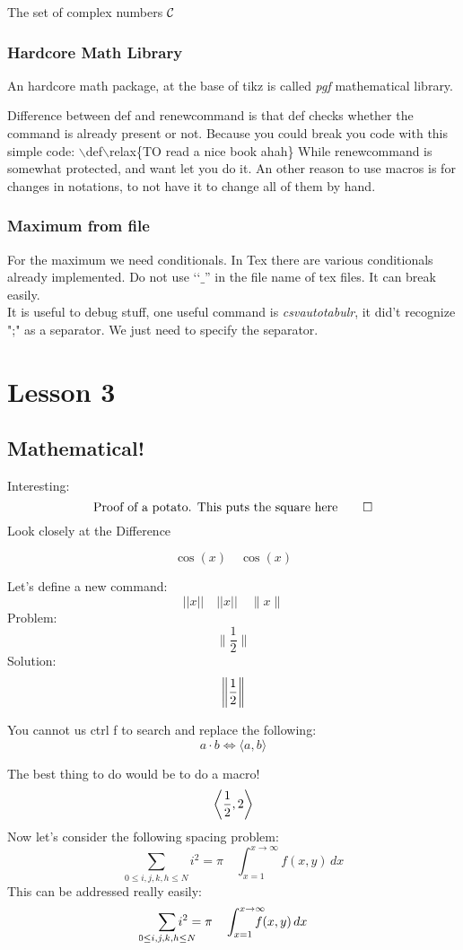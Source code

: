 \documentclass[11pt,a4paper,oneside,openany]{book}
\newcommand\normone[1]{|| #1 ||} %
\newcommand\normtwo[1]{\vert\vert #1 \vert\vert} %
\newcommand\normthree[1]{\lVert #1\rVert} %
\DeclarePairedDelimiter{\norm}{\lVert}{\rVert}
\DeclarePairedDelimiter{\angular}{\langle}{\rangle}
\newcommand\innerprod[2]{\angular*{#1,#2}}
\begin{document}
The set of complex numbers \(\mathcal{C}\)

\subsection{Hardcore Math Library}
An hardcore math package, at the base of tikz is called \emph{pgf} mathematical library.


Difference between def and renewcommand is that def checks whether the command is already present or not.
Because you could break you code with this simple code: 
\(\backslash\)def\(\backslash\)relax\{TO read a nice book ahah\}
While renewcommand is somewhat protected, and want let you do it. An other reason to use macros is for changes in notations, to not have it to change all of them by hand.

\subsection{Maximum from file}
For the maximum we need conditionals. In Tex there are various conditionals already implemented.
Do not use \lq\lq\(\_ \)'' in the file name of tex files. It can break easily. \\ It is useful to debug stuff, one useful command is \emph{csvautotabulr}, it did't recognize ";" as a separator. We just need to specify the separator.



\chapter{Lesson 3}
\section{Mathematical!}
Interesting: 
\[
\text{Proof of a potato. This puts the square here} \hfill \qed    
\]
Look closely at the Difference
\begin{Huge}
\[
\cos(x)  \quad \cos \left( x \right)   
\]
\end{Huge}
Let's define a new command:
\[
\normone{x} \quad \normtwo{x} \quad \normthree{x}
\]
Problem:
\[
    \normthree{\frac12}\]
Solution:
\[
    \norm*{\frac12}\]

You cannot us ctrl f to search and replace the following:
\[
    a \cdot b \iff \langle a,b \rangle\]


The best thing to do would be to do a macro!
\[
    \innerprod{\frac12}{2}
    \]
Now let's consider the following spacing problem:
\[
    \sum_{0 \le i,j,k,h \le N} i^2 = \pi \quad \int_{x=1}^{x \to \infty}f(x,y)\,dx\]
This can be addressed really easily:
\[
    \sum_{\mathclap{0 \le i,j,k,h \le N}} i^2 = \pi \quad \int_{x=1}^{\mathrlap{x \to \infty}}f(x,y)\,dx
\]
\end{document}

